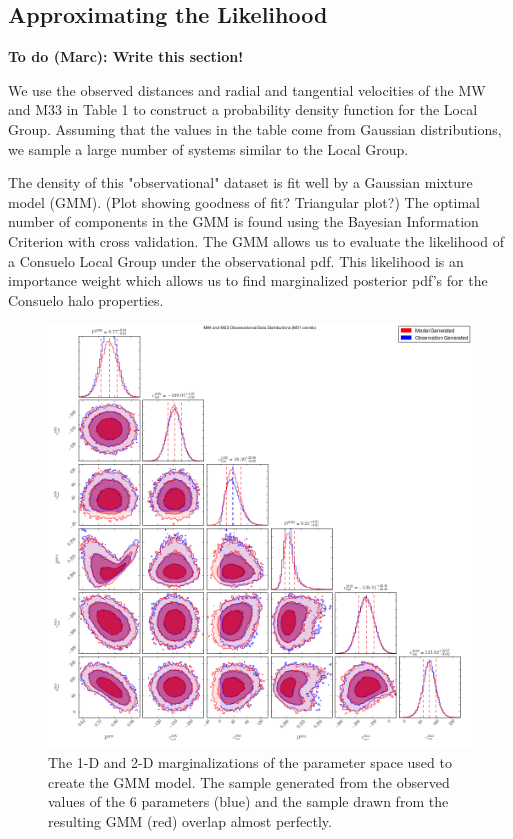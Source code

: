 \documentclass[iop,apj]{emulateapj}
\newcommand{\todo}[2]{{\bf To do (#1): #2}}
\begin{document}

\subsection{Approximating the Likelihood}
\label{sec:lhood}

\todo{Marc}{Write this section!}

We use the observed distances and radial and tangential velocities of the MW and M33 in Table 1 to construct a probability density function for the Local Group. Assuming that the values in the table come from Gaussian distributions, we sample a large number of systems similar to the Local Group. 

The density of this "observational" dataset is fit well by a Gaussian mixture model (GMM). (Plot showing goodness of fit? Triangular plot?) The optimal number of components in the GMM is found using the Bayesian Information Criterion with cross validation. The GMM allows us to evaluate the likelihood of a Consuelo Local Group under the observational pdf. This likelihood is an importance weight which allows us to find marginalized posterior pdf's for the Consuelo halo properties.


\begin{figure}
  \centering \includegraphics[width=\textwidth]{plots/model_gof.png}
  \caption{The 1-D and 2-D marginalizations of the parameter space used to create the GMM model. The sample generated from the observed values of the 6 parameters (blue) and the sample drawn from the resulting GMM (red) overlap almost perfectly.}
  \label{fig:gof}
\end{figure}
\end{document}
